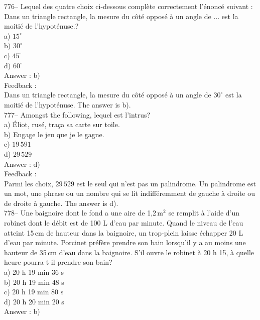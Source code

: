﻿\documentclass[letterpaper, 12pt]{article}
\begin{document}
776-- Lequel des quatre choix ci-dessous compl\`ete correctement
l'\'enonc\'e suivant : \og Dans un triangle rectangle, la mesure du
c\^ot\'e oppos\'e \`a un angle de $\ldots$ est la moiti\'e de l'hypot\'enuse.\fg ?\\
a) $15^{\circ}$\\
b) $30^{\circ}$\\
c) $45^{\circ}$\\
d) $60^{\circ}$\\

Answer : b)\\

Feedback : \\
Dans un triangle rectangle, la mesure du c\^ot\'e oppos\'e \`a un angle de
$30^{\circ}$ est la moiti\'e de l'hypot\'enuse.  The answer is b).\\


777-- Amongst the following, lequel est l'intrus?\\
a) \'Eliot, rus\'e, tra\c ca sa carte sur toile.\\
b) Engage le jeu que je le gagne.\\
c) $19\,591$\\
d) $29\,529$\\

Answer : d)\\

Feedback : \\
Parmi les choix, $29\,529$ est le seul qui n'est pas un palindrome.  Un
palindrome est un mot, une phrase ou un nombre qui se lit indiff\'eremment
de gauche \`a droite ou de droite \`a gauche.  The answer is d).\\

778-- Une baignoire dont le fond a une aire de 1,2\,m$^{2}$ se remplit \`a
l'aide d'un robinet dont le d\'ebit est de 100 L d'eau par minute.  Quand le
niveau de l'eau atteint 15\,cm de hauteur dans la baignoire, un trop-plein
laisse \'echapper 20 L d'eau par minute.  Porcinet pr\'ef\`ere prendre son
bain lorsqu'il y a au moins une hauteur de 35\,cm d'eau dans la baignoire.
S'il ouvre le robinet \`a 20 h 15, \`a quelle heure pourra-t-il prendre son
bain?\\
a) 20 h 19 min 36 s\\
b) 20 h 19 min 48 s\\
c) 20 h 19 min 80 s\\
d) 20 h 20 min 20 s\\


Answer : b)\\
\end{document}
